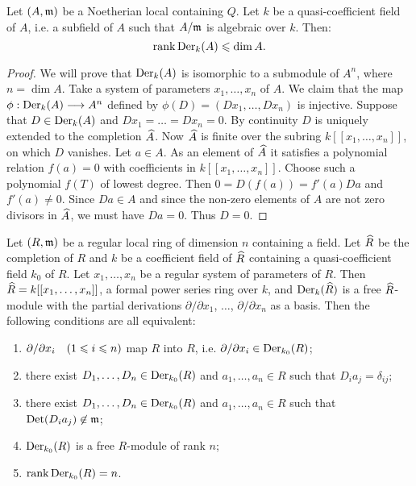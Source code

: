 \documentclass[../main]{subfiles}
\begin{document}
\begin{partheorem}\label{thm:098}
Let $(A, \mathfrak{m})$ be a Noetherian local  containing $Q$. Let $k$ be a quasi-coefficient field of $A$, i.e. a subfield of $A$ such that $A/\mathfrak{m}$ is algebraic over $k$. Then: 
\[
\operatorname{rank} \operatorname{Der}_k(A) \leqslant \operatorname{dim} A.
\]
\end{partheorem}

\begin{proof}
We will prove that $\operatorname{Der}_k(A)$ is isomorphic to a submodule of $A^n$, where $n = \dim A$. Take a system of parameters $x_1, \ldots, x_n$ of $A$. We claim that the map $\phi : \operatorname{Der}_k(A) \longrightarrow A^n$ defined by $\phi(D) = (D x_1, \ldots, D x_n)$ is injective. Suppose that $D \in \operatorname{Der}_k(A)$ and $D x_1 = \ldots = D x_n = 0$. By continuity $D$ is uniquely extended to the completion $\widehat{A}$. Now $\widehat{A}$ is finite over the subring $k[[x_1, \ldots, x_n]]$, on which $D$ vanishes. Let $a \in A$. As an element of $\widehat{A}$ it satisfies a polynomial relation $f(a) = 0$ with coefficients in $k[[x_1, \ldots, x_n]]$. Choose such a polynomial $f(T)$ of lowest degree. Then $0 = D(f(a)) = f'(a) Da$ and $f'(a) \ne 0$. Since $D a \in A$ and since the non-zero elements of $A$ are not zero divisors in $\widehat{A}$, we must have $D a = 0$. Thus $D = 0$. 
\end{proof}

\begin{theorem}\label{thm:099}
Let $(R, \mathfrak{m})$ be a regular local ring of dimension $n$ containing a field. Let $\widehat{R}$ be the completion of $R$ and $k$ be a coefficient field of $\widehat{R}$ containing a quasi-coefficient field $k_0$ of $R$. Let $x_1, \ldots, x_n$ be a regular system of parameters of $R$. Then $\widehat{R} = k[[x_1, \dots, x_n]]$, a formal power series ring over $k$, and $\operatorname{Der}_k(\widehat{R})$ is a free $\widehat{R}$-module with the partial derivations $\partial/\partial x_1$, $\ldots$, $\partial/\partial x_n$ as a basis. Then the following conditions are all equivalent: 

\begin{enumerate}[label=(\arabic*)]
    \item $\partial/\partial x_i\for{1 \le i \le n}$ map $R$ into $R$, i.e. $\partial/\partial x_i \in \operatorname{Der}_{k_0}(R)$;
    \item there exist $D_1, \dots, D_n \in \operatorname{Der}_{k_0}(R)$ and $a_1, \ldots, a_n \in R$ such that $D_i a_j = \delta_{ij}$;
    \item there exist $D_1, \dots, D_n \in \operatorname{Der}_{k_0}(R)$ and $a_1, \ldots, a_n \in R$ such that $\operatorname{Det}(D_i a_j) \not \in \mathfrak{m}$;
    \item $\operatorname{Der}_{k_0}(R)$ is a free $R$-module of rank $n$;
    \item $\operatorname{rank} \operatorname{Der}_{k_0}(R) = n$.
\end{enumerate}
\end{theorem}
\end{document}
